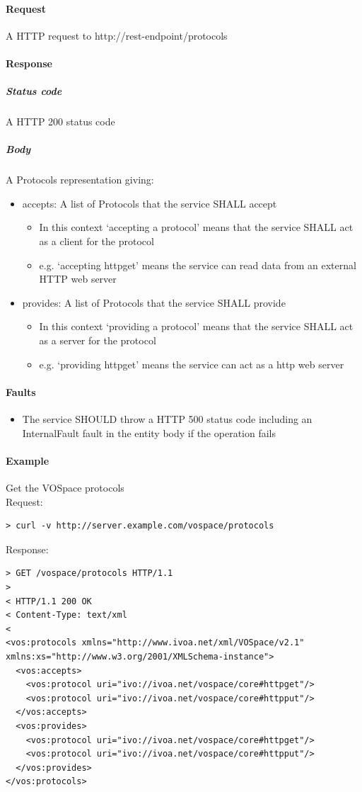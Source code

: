 \documentclass[11pt,a4paper]{ivoa}
\begin{document}
\paragraph{Request}
A HTTP request to http://rest-endpoint/protocols

\paragraph{Response}
\subparagraph{Status code} A HTTP 200 status code
\subparagraph{Body}
A Protocols representation giving:
\begin{itemize}
    \item accepts: A list of Protocols that the service SHALL accept
    \begin{itemize}
        \item In this context `accepting a protocol' means that the service SHALL act as a client for the protocol
        \item e.g. `accepting httpget' means the service can read data from an external HTTP web server
    \end{itemize}
    \item provides: A list of Protocols that the service SHALL provide
    \begin{itemize}
        \item In this context `providing a protocol' means that the service SHALL act as a server for the protocol
        \item e.g. `providing httpget' means the service can act as a http web server
    \end{itemize}
\end{itemize}

\paragraph{Faults}
\begin{itemize}
    \item The service SHOULD throw a HTTP 500 status code including an InternalFault fault in the entity body if the operation fails
\end{itemize}

\paragraph{Example}
Get the VOSpace protocols
\\[5px]
\noindent
Request:
\begin{lstlisting}
> curl -v http://server.example.com/vospace/protocols
\end{lstlisting}
Response:
\begin{lstlisting}
> GET /vospace/protocols HTTP/1.1
>
< HTTP/1.1 200 OK
< Content-Type: text/xml
<
<vos:protocols xmlns="http://www.ivoa.net/xml/VOSpace/v2.1" xmlns:xs="http://www.w3.org/2001/XMLSchema-instance">
  <vos:accepts>
    <vos:protocol uri="ivo://ivoa.net/vospace/core#httpget"/>
    <vos:protocol uri="ivo://ivoa.net/vospace/core#httpput"/>
  </vos:accepts>
  <vos:provides>
    <vos:protocol uri="ivo://ivoa.net/vospace/core#httpget"/>
    <vos:protocol uri="ivo://ivoa.net/vospace/core#httpput"/>
  </vos:provides>
</vos:protocols>
\end{lstlisting}
\end{document}
